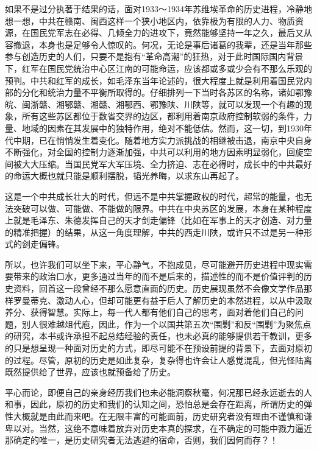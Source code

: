 如果不是过分执著于结果的话，面对1933～1934年苏维埃革命的历史进程，冷静地想一想，中共在赣南、闽西这样一个狭小地区内，依靠极为有限的人力、物质资源，在国民党军志在必得、几倾全力的进攻下，竟然能够坚持一年之久，最后又从容撤退，本身也是足够令人惊叹的。何况，无论是事后诸葛的我辈，还是当年那些参与创造历史的人们，只要不是抱有“革命高潮”的狂热，对于此时国际国内背景下，红军在国民党统治中心区江南的可能命运，应该都或多或少会有不那么乐观的预判。中共和红军的成长，如毛泽东当年论述的，很大程度上就是利用着国民党内部的分化和统治力量不平衡所取得的。仔细排列一下当时各苏区的名称，诸如鄂豫皖、闽浙赣、湘鄂赣、湘赣、湘鄂西、鄂豫陕、川陕等，就可以发现一个有趣的现象，所有这些苏区都位于数省交界的边区，都利用着南京政府控制软弱的条件，力量、地域的因素在其发展中的独特作用，绝对不能低估。然而，这一切，到1930年代中期，已在悄悄发生着变化。随着地方实力派挑战的相继被击退，南京中央自身不断强化，对全国的控制力逐渐加强，中共可以利用的地方因素明显弱化，回旋空间被大大压缩。当国民党军大军压境、全力挤迫、志在必得时，成长中的中共最好的命运大概也就只能是顺利摆脱，韬光养晦，以求东山再起了。

这是一个中共成长壮大的时代，但远不是中共掌握政权的时代，超常的能量，也无法突破可以做、可能做、不能做的限界。中共在中央苏区的发展，本身在某种程度上就是毛泽东、朱德发挥自己的天才剑走偏锋（比如在军事上的天才创造、对力量的精准把握）的结果，从这一角度理解，中共的西走川陕，或许只不过是另一种形式的剑走偏锋。

所以，也许我们可以坐下来，平心静气，不抱成见，尽可能避开历史进程中现实需要带来的政治口水，更多通过当年的而不是后来的，描述性的而不是价值评判的历史资料，回首这一段曾经不那么愿意直面的历史。历史展现虽然不会像文学作品那样罗曼蒂克、激动人心，但却可能更有益于后人了解历史的本然进程，以从中汲取养分、获得智慧。实际上，每一代人都有他们自己的思考，面对着他们自己的问题，别人很难越俎代庖，因此，作为一个以国共第五次“围剿”和反“围剿”为聚焦点的研究，本书或许承担不起总结经验的责任，也未必真的能够提供若干教训，更多的只是想呈现一种面对历史的方式，即尽可能不在预设前提的背景下，去面对原初的过程。尽管，原初的历史是如此复杂，复杂得也许会让人感觉混乱，但光怪陆离既然提供给了世界，应该也就预备给了历史。

平心而论，即便自己的亲身经历我们也未必能洞察秋毫，何况那已经永远逝去的人和事，因此，原初的历史和我们的认知之间，恐怕总是会存在距离，所谓历史的弹性大概就是由此而来吧。在无限丰富的可能面前，历史研究者没有理由不谨慎和谦卑以对。当然，这绝不意味着放弃对历史本真的探求，在不确定的可能中戮力逼近那确定的唯一，是历史研究者无法逃避的宿命，否则，我们因何而存？！
